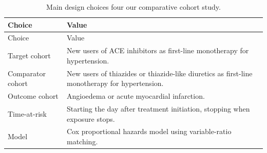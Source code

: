 \documentclass[11pt]{book}
\theoremstyle{definition}
\theoremstyle{definition}
\theoremstyle{definition}
\theoremstyle{remark}
\begin{document}
\begin{longtable}[]{@{}ll@{}}
\caption{\label{tab:aceChoices} Main design choices four our comparative cohort study.}\tabularnewline
\toprule
\begin{minipage}[b]{0.23\columnwidth}\raggedright
Choice\strut
\end{minipage} & \begin{minipage}[b]{0.72\columnwidth}\raggedright
Value\strut
\end{minipage}\tabularnewline
\midrule
\endfirsthead
\toprule
\begin{minipage}[b]{0.23\columnwidth}\raggedright
Choice\strut
\end{minipage} & \begin{minipage}[b]{0.72\columnwidth}\raggedright
Value\strut
\end{minipage}\tabularnewline
\midrule
\endhead
\begin{minipage}[t]{0.23\columnwidth}\raggedright
Target cohort\strut
\end{minipage} & \begin{minipage}[t]{0.72\columnwidth}\raggedright
New users of ACE inhibitors as first-line monotherapy for hypertension.\strut
\end{minipage}\tabularnewline
\begin{minipage}[t]{0.23\columnwidth}\raggedright
Comparator cohort\strut
\end{minipage} & \begin{minipage}[t]{0.72\columnwidth}\raggedright
New users of thiazides or thiazide-like diuretics as first-line monotherapy for hypertension.\strut
\end{minipage}\tabularnewline
\begin{minipage}[t]{0.23\columnwidth}\raggedright
Outcome cohort\strut
\end{minipage} & \begin{minipage}[t]{0.72\columnwidth}\raggedright
Angioedema or acute myocardial infarction.\strut
\end{minipage}\tabularnewline
\begin{minipage}[t]{0.23\columnwidth}\raggedright
Time-at-risk\strut
\end{minipage} & \begin{minipage}[t]{0.72\columnwidth}\raggedright
Starting the day after treatment initiation, stopping when exposure stops.\strut
\end{minipage}\tabularnewline
\begin{minipage}[t]{0.23\columnwidth}\raggedright
Model\strut
\end{minipage} & \begin{minipage}[t]{0.72\columnwidth}\raggedright
Cox proportional hazards model using variable-ratio matching.\strut
\end{minipage}\tabularnewline
\bottomrule
\end{longtable}
\end{document}

